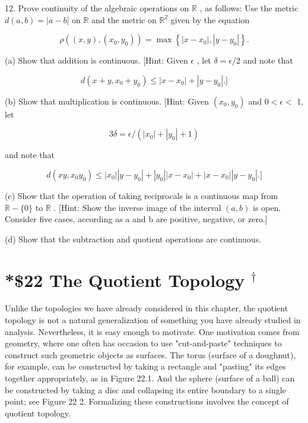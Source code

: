 \documentclass[10pt]{article}
\begin{document}
12. Prove continuity of the algebraic operations on \(\mathbb{R}\) , as follows: Use the metric \(d\left( {a,b}\right)  = \left| {a - b}\right|\) on \(\mathbb{R}\) and the metric on \({\mathbb{R}}^{2}\) given by the equation

\[
\rho \left( {\left( {x,y}\right) ,\left( {{x}_{0},{y}_{0}}\right) }\right)  = \max \left\{  {\left| {x - {x}_{0}}\right| ,\left| {y - {y}_{0}}\right| }\right\}  .
\]

(a) Show that addition is continuous. [Hint: Given \(\epsilon\) , let \(\delta  = \epsilon /2\) and note that

\[
d\left( {x + y,{x}_{0} + {y}_{0}}\right)  \leq  \left| {x - {x}_{0}}\right|  + \left| {y - {y}_{0}}\right| .\rbrack
\]

(b) Show that multiplication is continuous. [Hint: Given \(\left( {{x}_{0},{y}_{0}}\right)\) and \(0 < \epsilon  <\) 1, let

\[
{3\delta } = \epsilon /\left( {\left| {x}_{0}\right|  + \left| {y}_{0}\right|  + 1}\right)
\]

and note that

\[
d\left( {{xy},{x}_{0}{y}_{0}}\right)  \leq  \left| {x}_{0}\right| \left| {y - {y}_{0}}\right|  + \left| {y}_{0}\right| \left| {x - {x}_{0}}\right|  + \left| {x - {x}_{0}}\right| \left| {y - {y}_{0}}\right| .\rbrack
\]

(c) Show that the operation of taking reciprocals is a continuous map from \(\mathbb{R} - \{ 0\}\) to \(\mathbb{R}\) . [Hint: Show the inverse image of the interval \(\left( {a,b}\right)\) is open. Consider five cases, according as a and b are positive, negative, or zero.]

(d) Show that the subtraction and quotient operations are continuous.

\section*{*\$22 The Quotient Topology \({}^{ \dagger  }\)}

Unlike the topologies we have already considered in this chapter, the quotient topology is not a natural generalization of something you have already studied in analysis. Nevertheless, it is easy enough to motivate. One motivation comes from geometry, where one often has occasion to use "cut-and-paste" techniques to construct such geometric objects as surfaces. The torus (surface of a doughnut), for example, can be constructed by taking a rectangle and "pasting" its edges together appropriately, as in Figure 22.1. And the sphere (surface of a ball) can be constructed by taking a disc and collapsing its entire boundary to a single point; see Figure 22 2. Formalizing these constructions involves the concept of quotient topology.
\end{document}
